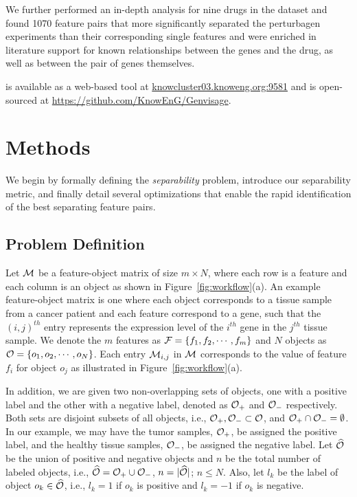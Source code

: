 We further performed an in-depth analysis 
for nine drugs in the \lincs dataset and 
found 1070 feature pairs that more significantly 
separated the perturbagen experiments than their 
corresponding single features and were enriched 
in literature support for known relationships between the genes and the drug, 
as well as between the pair of genes themselves. 

\genviz is available as a web-based tool at \url{knowcluster03.knoweng.org:9581} 
 and is open-sourced at \url{https://github.com/KnowEnG/Genvisage}.


\section{Methods}
\label{sec:method}
We begin by formally defining the {\em separability} problem, 
introduce our separability metric, 
and finally detail several optimizations that enable 
the rapid identification of the best separating feature pairs.

\subsection{Problem Definition}\label{sec:prob}

Let $\mm$ be a feature-object matrix of size $m\times N$, where each row is a feature and each column is an object as shown in Figure~\ref{fig:workflow}(a). An example feature-object matrix is one where each object corresponds to a tissue sample from a cancer patient and each feature correspond to a gene, such that the $(i,j)^{th}$ entry represents the expression level of the $i^{th}$ gene in the $j^{th}$ tissue sample. We denote the $m$ features as $\ff=\{f_1,f_2,\cdots,f_m\}$ and $N$ objects as $\oo=\{o_1,o_2,\cdots,o_N\}$. Each entry $\mm_{i,j}$ in $\mm$ corresponds
to the value of feature $f_i$ for object $o_j$ as illustrated in Figure~\ref{fig:workflow}(a).

In addition, we are given two non-overlapping sets of objects, one with a positive label and the other with a negative label, denoted as $\oo_+$ and $\oo_-$ respectively. Both sets are disjoint subsets of all objects, i.e., $\oo_+, \oo_-\subset \oo$, and $\oo_+\cap \oo_- = \emptyset$. In our example, we may have the tumor samples, $\oo_+$, be assigned the positive label, and the healthy tissue samples, $\oo_-$, be assigned the negative label. Let $\widehat{\oo}$ be the union of positive and negative objects and $n$ be the total number of labeled objects, i.e., $\widehat{\oo}=\oo_+\cup \oo_-$, $n=|\widehat{\oo}|$; $n\leq N$. Also, let $l_k$ be the label of object $o_k\in \widehat{\oo}$, i.e., $l_k=1$ if $o_k$ is positive and $l_k=-1$ if $o_k$ is negative.

